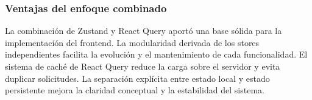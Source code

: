 \subsubsection{Ventajas del enfoque combinado}

La combinación de Zustand y React Query aportó una base sólida para la implementación del frontend. La modularidad derivada de los stores independientes facilita la evolución y el mantenimiento de cada funcionalidad. El sistema de caché de React Query reduce la carga sobre el servidor y evita duplicar solicitudes. La separación explícita entre estado local y estado persistente mejora la claridad conceptual y la estabilidad del sistema.



